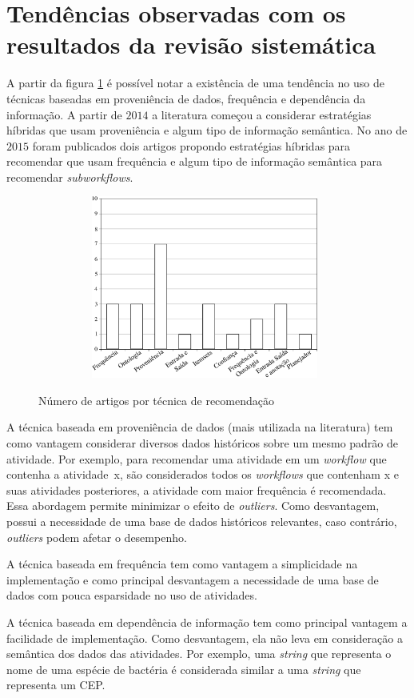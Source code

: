 \section{Tendências observadas com os resultados da revisão sistemática}
A partir da figura \ref{figTecnicasPorQuantidade} é possível notar a existência de uma tendência no uso de técnicas baseadas em proveniência de dados, frequência e dependência da informação. A partir de \(2014\) a literatura começou a considerar estratégias híbridas que usam proveniência e algum tipo de informação semântica. No ano de \(2015\) foram publicados dois artigos propondo estratégias híbridas para recomendar que usam frequência e algum tipo de informação semântica para recomendar \emph{subworkflows}.
\begin{figure}[H]
	\centering
 	  \caption{Número de artigos por técnica de recomendação}
		\includegraphics[width=11cm,height=6cm]{./secoes/correlatos/pics/img/GraficoQuantidadeTecnica.eps}
	\label{figTecnicasPorQuantidade}
  	\source{\varAutorData}
\end{figure}

A técnica baseada em proveniência de dados (mais utilizada na literatura) tem como vantagem considerar diversos dados históricos sobre um mesmo padrão de atividade. Por exemplo, para recomendar uma atividade em um \emph{workflow} que contenha a atividade~x, são considerados todos os \emph{workflows} que contenham x e suas atividades posteriores, a atividade com maior frequência é recomendada. Essa abordagem permite minimizar o efeito de \emph{outliers}. Como desvantagem, possui a necessidade de uma base de dados históricos relevantes, caso contrário, \emph{outliers} podem afetar o desempenho.

A técnica baseada em frequência tem como vantagem a simplicidade na implementação e como principal desvantagem a necessidade de uma base de dados com pouca esparsidade no uso de atividades.

A técnica baseada em dependência de informação tem como principal vantagem a facilidade de implementação. Como desvantagem, ela não leva em consideração a semântica dos dados das atividades. Por exemplo, uma \emph{string} que representa o nome de uma espécie de bactéria é considerada similar a uma \emph{string} que representa um CEP.

